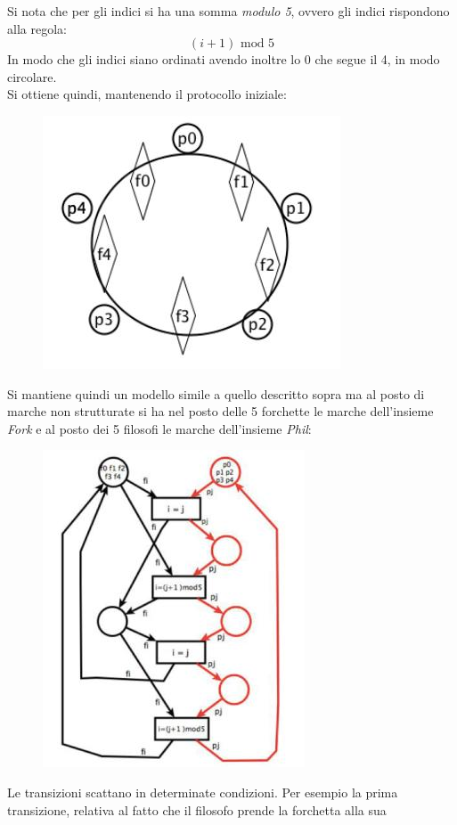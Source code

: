 \documentclass[a4paper,12pt, oneside]{book}
\begin{document}
Si nota che per gli indici si ha una somma \textit{modulo 5}, ovvero gli indici
rispondono alla regola:
\[(i+1) \mbox{ mod } 5\]
In modo che gli indici siano ordinati avendo inoltre lo 0 che segue il 4, in
modo circolare.\\
Si ottiene quindi, mantenendo il protocollo iniziale:
\begin{figure}[H]
  \centering
  \includegraphics[scale = 0.6]{img/pt17.jpg}
\end{figure}
Si mantiene quindi un modello simile a quello descritto sopra ma al posto di
marche non strutturate si ha nel posto delle 5 forchette le marche dell'insieme
\textit{Fork} e al posto dei 5 filosofi le marche dell'insieme \textit{Phil}:
\begin{figure}[H]
  \centering
  \includegraphics[scale = 0.6]{img/pt18.jpg}
\end{figure}
Le transizioni scattano in determinate condizioni. Per esempio la prima
transizione, relativa al fatto che il filosofo prende la forchetta alla sua
\end{document}
